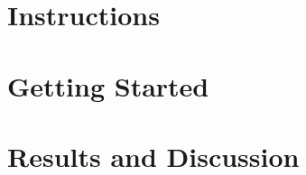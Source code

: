 




\section{Instructions}



\newpage

\section{Getting Started}



\newpage

\section{Results and Discussion}


\newpage


